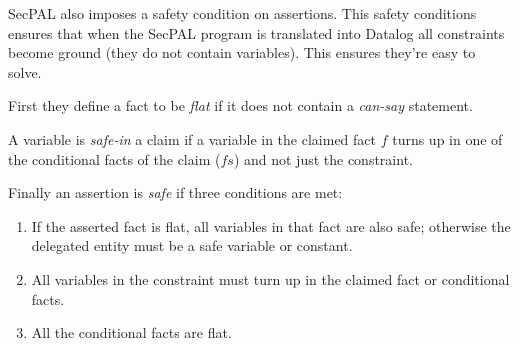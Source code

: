 \documentclass[a4paper,sfsidenotes]{%
  article%
}
\begin{document}
SecPAL also imposes a safety condition on assertions.  This safety conditions
ensures that when the SecPAL program is translated into Datalog all constraints
become ground (they do not contain variables).  This ensures they're easy to
solve. 

First they define a fact to be \emph{flat} if it does not contain a
\emph{can-say} statement.

\begin{algorithm}[H]
\end{algorithm}

A variable is \emph{safe-in} a claim if a variable in the claimed fact $f$ turns up in one of the
conditional facts of the claim ($fs$) and not just the constraint.

\begin{algorithm}[H]
\end{algorithm}

Finally an assertion is \emph{safe} if three conditions are met:

\begin{enumerate}
  \item If the asserted fact is flat, all variables in that fact are also safe;
    otherwise the delegated entity must be a safe variable or constant.
  \item All variables in the constraint must turn up in the claimed fact or
    conditional facts.
  \item All the conditional facts are flat.
\end{enumerate}
\end{document}
